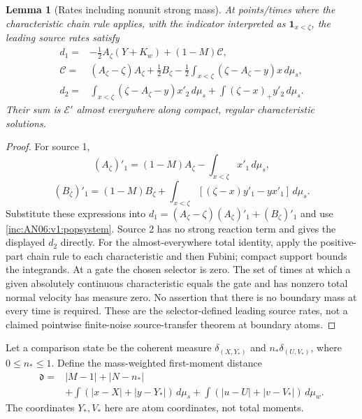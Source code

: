 \documentclass[11pt]{article}
\numberwithin{equation}{section}
\newtheorem{lemma}[theorem]{Lemma}
\theoremstyle{remark}\newtheorem{remark}[theorem]{Remark}
\newcommand{\1}{\mathbf 1}
\begin{document}
\begin{lemma}[Rates including nonunit strong mass]
\label{inc:AN06:v1:generalrates}
At points/times where the characteristic chain rule applies, with the
indicator interpreted as $\1_{x<\zeta}$, the leading source rates satisfy
\begin{align}
 d_1={}&-\tfrac12A_\zeta(Y+K_w)+(1-M)\mathcal C,\nonumber\\
 \mathcal C={}&(A_\zeta-\zeta)A_\zeta+\tfrac12B_\zeta
 -\tfrac12\int_{x<\zeta}(\zeta-A_\zeta-y)x\,d\mu_s,
 \label{inc:AN06:v1:generalrates-eq}\\
 d_2={}&\int_{x<\zeta}(\zeta-A_\zeta-y)x'_2\,d\mu_s
       +\int(\zeta-x)_+y'_2\,d\mu_s.
 \nonumber
\end{align}
Their sum is $\mathcal E'$ almost everywhere along compact, regular
characteristic solutions.
\end{lemma}
\begin{proof}
For source 1,
\[
 (A_\zeta)'_1=(1-M)A_\zeta-\int_{x<\zeta}x'_1\,d\mu_s,
\]
\[
 (B_\zeta)'_1=(1-M)B_\zeta+
 \int_{x<\zeta}[(\zeta-x)y'_1-yx'_1]\,d\mu_s.
\]
Substitute these expressions into
$d_1=(A_\zeta-\zeta)(A_\zeta)'_1+(B_\zeta)'_1$ and use
\eqref{inc:AN06:v1:popsystem}. Source 2 has no strong reaction term and
gives the displayed $d_2$ directly.
For the almost-everywhere total identity, apply the positive-part chain
rule to each characteristic and then Fubini; compact support bounds the
integrands. At a gate the chosen selector is zero. The set of times at
which a given absolutely continuous characteristic equals the gate and
has nonzero total normal velocity has measure zero. No assertion that
there is no boundary mass at every time is required. These are the
selector-defined leading source rates, not a claimed pointwise
finite-noise source-transfer theorem at boundary atoms.
\end{proof}

Let a comparison state be the coherent measure
$\delta_{(X,Y_*)}$ and $n_*\delta_{(U,V_*)}$, where $0\le n_*\le1$.
Define the mass-weighted first-moment distance
\begin{align}
 \mathfrak d={}&|M-1|+|N-n_*|\nonumber\\
 &+\int(|x-X|+|y-Y_*|)\,d\mu_s
 +\int(|u-U|+|v-V_*|)\,d\mu_w.
 \label{inc:AN06:v1:distance}
\end{align}
The coordinates $Y_*,V_*$ here are atom coordinates, not total moments.
\end{document}
